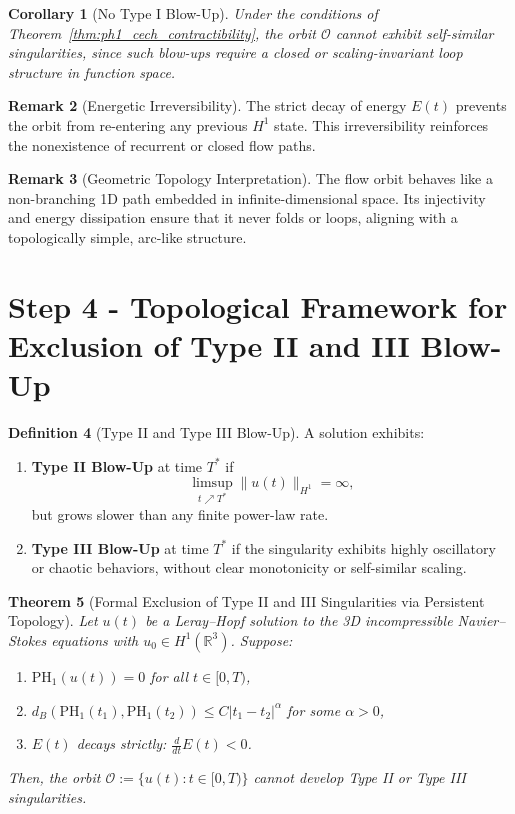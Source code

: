 \documentclass[11pt]{article}
\newtheorem{theorem}{Theorem}[section]
\newtheorem{corollary}[theorem]{Corollary}
\theoremstyle{definition}
\newtheorem{definition}[theorem]{Definition}
\newtheorem{remark}[theorem]{Remark}
\begin{document}
\begin{corollary}[No Type I Blow-Up]
Under the conditions of Theorem~\ref{thm:ph1_cech_contractibility}, the orbit $\mathcal{O}$ cannot exhibit self-similar singularities, since such blow-ups require a closed or scaling-invariant loop structure in function space.
\end{corollary}

\begin{remark}[Energetic Irreversibility]
The strict decay of energy $E(t)$ prevents the orbit from re-entering any previous $H^1$ state. This irreversibility reinforces the nonexistence of recurrent or closed flow paths.
\end{remark}

\begin{remark}[Geometric Topology Interpretation]
The flow orbit behaves like a non-branching 1D path embedded in infinite-dimensional space. Its injectivity and energy dissipation ensure that it never folds or loops, aligning with a topologically simple, arc-like structure.
\end{remark}


\section{Step 4 - Topological Framework for Exclusion of Type II and III Blow-Up}
\label{sec:step4}

\begin{definition}[Type II and Type III Blow-Up]
A solution exhibits:
\begin{enumerate}
  \item \textbf{Type II Blow-Up} at time $T^*$ if
  \[
  \limsup_{t \nearrow T^*} \|u(t)\|_{H^1} = \infty,
  \]
  but grows slower than any finite power-law rate.

  \item \textbf{Type III Blow-Up} at time $T^*$ if the singularity exhibits highly oscillatory or chaotic behaviors, without clear monotonicity or self-similar scaling.
\end{enumerate}
\end{definition}

\begin{theorem}[Formal Exclusion of Type II and III Singularities via Persistent Topology]
\label{thm:formal_typeII_III_exclusion}
Let $u(t)$ be a Leray--Hopf solution to the 3D incompressible Navier--Stokes equations with $u_0 \in H^1(\mathbb{R}^3)$. Suppose:
\begin{enumerate}
    \item $\mathrm{PH}_1(u(t)) = 0$ for all $t \in [0, T)$,
    \item $d_B(\mathrm{PH}_1(t_1), \mathrm{PH}_1(t_2)) \le C |t_1 - t_2|^\alpha$ for some $\alpha > 0$,
    \item $E(t)$ decays strictly: $\frac{d}{dt} E(t) < 0$.
\end{enumerate}
Then, the orbit $\mathcal{O} := \{u(t): t \in [0,T)\}$ cannot develop Type II or Type III singularities.
\end{theorem}
\end{document}
